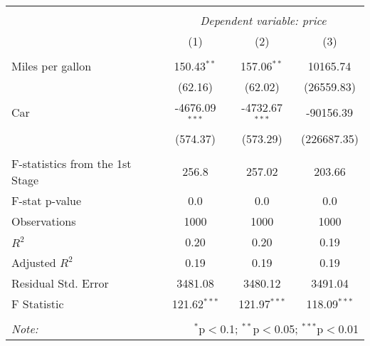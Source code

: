 
\begin{tabular}{@{\extracolsep{5pt}}lccc}
\\[-1.8ex]\hline
\hline \\[-1.8ex]
& \multicolumn{3}{c}{\textit{Dependent variable: price}} \
\cr \cline{2-4}
\\[-1.8ex] & (1) & (2) & (3) \\
\hline \\[-1.8ex]
 Miles per gallon & 150.43$^{**}$ & 157.06$^{**}$ & 10165.74$^{}$ \\
& (62.16) & (62.02) & (26559.83) \\
 Car & -4676.09$^{***}$ & -4732.67$^{***}$ & -90156.39$^{}$ \\
& (574.37) & (573.29) & (226687.35) \\
\hline \\[-1.8ex]
 F-statistics from the 1st Stage & 256.8 & 257.02 & 203.66 \\
 F-stat p-value & 0.0 & 0.0 & 0.0 \\
 Observations & 1000 & 1000 & 1000 \\
 $R^2$ & 0.20 & 0.20 & 0.19 \\
 Adjusted $R^2$ & 0.19 & 0.19 & 0.19 \\
 Residual Std. Error & 3481.08 & 3480.12 & 3491.04 \\
 F Statistic & 121.62$^{***}$ & 121.97$^{***}$ & 118.09$^{***}$ \\
\hline
\hline \\[-1.8ex]
\textit{Note:} & \multicolumn{3}{r}{$^{*}$p$<$0.1; $^{**}$p$<$0.05; $^{***}$p$<$0.01} \\
\end{tabular}
